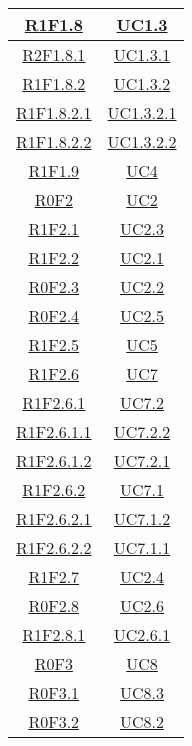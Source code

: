 \begin{longtable}{|c|c|}
\hline
\hyperlink{R1F1.8}{R1F1.8} & \hyperlink{UC1.3}{UC1.3}\\
\hline
\hyperlink{R2F1.8.1}{R2F1.8.1} & \hyperlink{UC1.3.1}{UC1.3.1}\\
\hline
\hyperlink{R1F1.8.2}{R1F1.8.2} & \hyperlink{UC1.3.2}{UC1.3.2}\\
\hline
\hyperlink{R1F1.8.2.1}{R1F1.8.2.1} & \hyperlink{UC1.3.2.1}{UC1.3.2.1}\\
\hline
\hyperlink{R1F1.8.2.2}{R1F1.8.2.2} & \hyperlink{UC1.3.2.2}{UC1.3.2.2}\\
\hline
\hyperlink{R1F1.9}{R1F1.9} & \hyperlink{UC4}{UC4}\\
\hline
\hyperlink{R0F2}{R0F2} & \hyperlink{UC2}{UC2}\\
\hline
\hyperlink{R1F2.1}{R1F2.1} & \hyperlink{UC2.3}{UC2.3}\\
\hline
\hyperlink{R1F2.2}{R1F2.2} & \hyperlink{UC2.1}{UC2.1}\\
\hline
\hyperlink{R0F2.3}{R0F2.3} & \hyperlink{UC2.2}{UC2.2}\\
\hline
\hyperlink{R0F2.4}{R0F2.4} & \hyperlink{UC2.5}{UC2.5}\\
\hline
\hyperlink{R1F2.5}{R1F2.5} & \hyperlink{UC5}{UC5}\\
\hline
\hyperlink{R1F2.6}{R1F2.6} & \hyperlink{UC7}{UC7}\\
\hline
\hyperlink{R1F2.6.1}{R1F2.6.1} & \hyperlink{UC7.2}{UC7.2}\\
\hline
\hyperlink{R1F2.6.1.1}{R1F2.6.1.1} & \hyperlink{UC7.2.2}{UC7.2.2}\\
\hline
\hyperlink{R1F2.6.1.2}{R1F2.6.1.2} & \hyperlink{UC7.2.1}{UC7.2.1}\\
\hline
\hyperlink{R1F2.6.2}{R1F2.6.2} & \hyperlink{UC7.1}{UC7.1}\\
\hline
\hyperlink{R1F2.6.2.1}{R1F2.6.2.1} & \hyperlink{UC7.1.2}{UC7.1.2}\\
\hline
\hyperlink{R1F2.6.2.2}{R1F2.6.2.2} & \hyperlink{UC7.1.1}{UC7.1.1}\\
\hline
\hyperlink{R1F2.7}{R1F2.7} & \hyperlink{UC2.4}{UC2.4}\\
\hline
\hyperlink{R0F2.8}{R0F2.8} & \hyperlink{UC2.6}{UC2.6}\\
\hline
\hyperlink{R1F2.8.1}{R1F2.8.1} & \hyperlink{UC2.6.1}{UC2.6.1}\\
\hline
\hyperlink{R0F3}{R0F3} & \hyperlink{UC8}{UC8}\\
\hline
\hyperlink{R0F3.1}{R0F3.1} & \hyperlink{UC8.3}{UC8.3}\\
\hline
\hyperlink{R0F3.2}{R0F3.2} & \hyperlink{UC8.2}{UC8.2}\\

\end{longtable}
